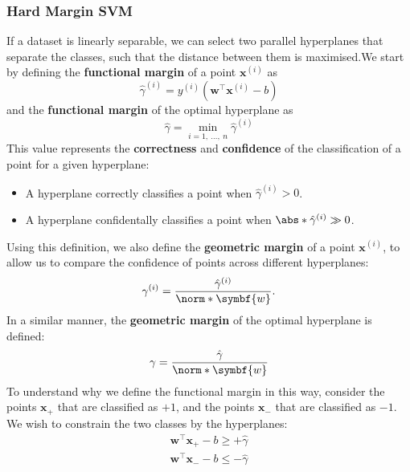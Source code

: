 \documentclass{article}
\begin{document}
\subsubsection{Hard Margin SVM}
If a dataset is linearly separable, we can select two parallel
hyperplanes that separate the classes, such that the distance between
them is maximised.We start by defining the \textbf{functional margin}
of a point \(\symbf{x}^{\left( i \right)}\) as
\begin{equation*}
    \hat{\gamma}^{\left( i \right)} = y^{\left( i \right)} \left( \symbf{w}^\top \symbf{x}^{\left( i \right)} - b \right)
\end{equation*}
and the \textbf{functional margin} of the optimal hyperplane as
\begin{equation*}
    \hat{\gamma} = \min_{i =  1,\:\dots,\: n} \hat{\gamma}^{\left( i \right)}
\end{equation*}
This value represents the \textbf{correctness} and \textbf{confidence}
of the classification of a point for a given hyperplane:
\begin{itemize}
    \item A hyperplane correctly classifies a point when
          \(\hat{\gamma}^{\left( i \right)} > 0\).
    \item A hyperplane confidentally classifies a point when
          \(\abs*{\hat{\gamma}^{\left( i \right)}} \gg 0\).
\end{itemize}
Using this definition, we also define the \textbf{geometric margin} of a
point \(\symbf{x}^{\left( i \right)}\), to allow us to compare the
confidence of points across different hyperplanes:
\begin{equation*}
    \gamma^{\left( i \right)} = \frac{\hat{\gamma}^{\left( i \right)}}{\norm*{\symbf{w}}}.
\end{equation*}
In a similar manner, the \textbf{geometric margin} of the optimal
hyperplane is defined:
\begin{equation*}
    \gamma = \frac{\hat{\gamma}}{\norm*{\symbf{w}}}
\end{equation*}
To understand why we define the functional margin in this way, consider
the points \(\symbf{x}_{{+}}\) that are classified as \({+}1\), and the
points \(\symbf{x}_{{-}}\) that are classified as \({-}1\). We wish to
constrain the two classes by the hyperplanes:
\begin{gather*}
    \symbf{w}^\top \symbf{x}_{{+}} - b \geqslant {+}\hat{\gamma} \\
    \symbf{w}^\top \symbf{x}_{{-}} - b \leqslant {-}\hat{\gamma}
\end{gather*}
\end{document}
